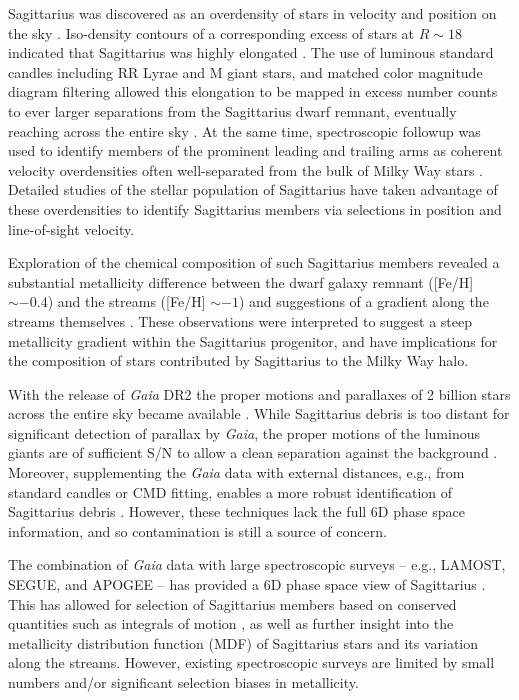 \documentclass[twocolumn,tighten,twocolappendix]{aastex63}
\newcommand{\sgr}{Sagittarius}
\begin{document}
\begin{CJK*}{UTF8}{gbsn}
\sgr{} was discovered as an overdensity of stars in velocity and position on the sky \citep{Ibata94}. Iso-density contours of a corresponding excess of stars at $R\sim18$ indicated that \sgr{} was highly elongated \citep{Ibata95}.  The use of luminous standard candles including RR Lyrae and M giant stars, and matched color magnitude diagram filtering allowed this elongation to be mapped in excess number counts to ever larger separations from the \sgr{} dwarf remnant, eventually reaching across the entire sky \citep[e.g.,][]{Mateo96, Alard96, Alcock97, Totten98, Mateo98, Majewski99, Ibata01, Newberg03, Majewski03, Belokurov06, Belokurov14, Sesar17, Hernitschek17}.  At the same time, spectroscopic followup was used to identify members of the prominent leading and trailing arms as coherent velocity overdensities often well-separated from the bulk of Milky Way stars \citep[e.g.,][]{Ibata97, Majewski99, Majewski04, Belokurov14}.  Detailed studies of the stellar population of \sgr{} have taken advantage of these overdensities to identify \sgr{} members via selections in position and line-of-sight velocity.

Exploration of the chemical composition of such \sgr{} members revealed a substantial metallicity difference between the dwarf galaxy remnant ([Fe/H]$\sim -0.4$) and the streams ([Fe/H] $\sim -1$) and suggestions of a gradient along the streams themselves \citep[e.g.][]{Bellazzini06, Chou07, Monaco07, Carlin12, Gibbons17}.  These observations were interpreted to suggest a steep metallicity gradient within the \sgr{} progenitor, and have implications for the composition of stars contributed by \sgr{} to the Milky Way halo.

With the release of \emph{Gaia} DR2 the proper motions and parallaxes of 2 billion stars across the entire sky became available \citep{GaiaDR2}.  While \sgr{} debris is too distant for significant detection of parallax by \emph{Gaia}, the proper motions of the luminous giants are of sufficient S/N to allow a clean separation against the background \citep{Antoja20}.  Moreover, supplementing the \emph{Gaia} data with external distances, e.g., from standard candles or CMD fitting, enables a more robust identification of \sgr{} debris \citep[e.g.,][]{Ibata20, Ramos20}.  However, these techniques lack the full 6D phase space information, and so contamination is still a source of concern.

The combination of \emph{Gaia} data with large spectroscopic surveys -- e.g., LAMOST, SEGUE, and APOGEE -- has provided a 6D phase space view of \sgr{} \citep{Li19, Yang19, Hayes20}.  This has allowed for selection of \sgr{} members based on conserved quantities such as integrals of motion \citep{Li19, Yang19, Hayes20}, as well as further insight into the metallicity distribution function (MDF) of \sgr{} stars and its variation along the streams. However, existing spectroscopic surveys are limited by small numbers and/or significant selection biases in metallicity.


\end{CJK*}
\end{document}
